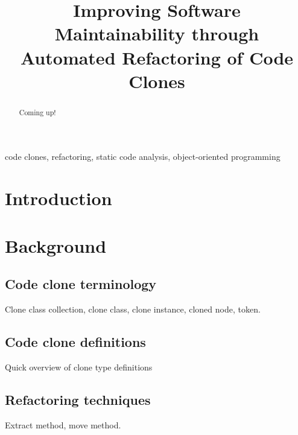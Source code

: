 \documentclass[conference]{IEEEtran}
\begin{document}
\title{Improving Software Maintainability through Automated Refactoring of Code Clones}

\author{
\and
{}
}

\maketitle

\begin{abstract}
Coming up!
\end{abstract}

\begin{IEEEkeywords}
code clones, refactoring, static code analysis, object-oriented programming
\end{IEEEkeywords}

\section{Introduction}


\section{Background}

\subsection{Code clone terminology}
Clone class collection, clone class, clone instance, cloned node, token.

\subsection{Code clone definitions}
Quick overview of clone type definitions

\subsection{Refactoring techniques}
Extract method, move method.
\end{document}
